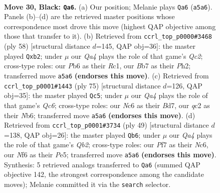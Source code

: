 \documentclass[11pt]{article}
\begin{document}
\clearpage

\begin{figure}[p]\centering
\begin{subfigure}{0.46\textwidth}\centering
\resizebox{\linewidth}{!}{%
\newchessgame
\chessboard[
  setfen={4rk2/Pb2rp2/1pn2n2/qN1p1BNP/P2P2p1/6R1/2Q2K2/7R b - - 0 30},
  showmover=false,
  pgfstyle=straightmove, color=movearrow, markmove={a5-a6}
]}
\caption{}
\end{subfigure}\hfill
\begin{subfigure}{0.46\textwidth}\centering
\resizebox{\linewidth}{!}{%
\newchessgame
\chessboard[
  setfen={4r1k1/rb2qpp1/1pp2n1p/3p4/3PP3/P2N1PP1/1nQ3BP/2R1R1K1 w - - 0 30},
  showmover=false,
  pgfstyle=straightmove, color=movearrow, markmove={c2-b2}
]}
\caption{}
\end{subfigure}
\\[4pt]
\begin{subfigure}{0.46\textwidth}\centering
\resizebox{\linewidth}{!}{%
\newchessgame
\chessboard[
  setfen={r1r3k1/3b1p2/1n4p1/1P1p3p/p2N3P/2q1P1P1/R3BP1K/1R1Q4 b - - 25 38},
  showmover=false,
  pgfstyle=straightmove, color=movearrow, markmove={c3-c5}
]}
\caption{}
\end{subfigure}\hfill
\begin{subfigure}{0.46\textwidth}\centering
\resizebox{\linewidth}{!}{%
\newchessgame
\chessboard[
  setfen={1r1rk3/1q2bp2/2n2n1Q/1N1ppP2/p3P3/P6P/NPP5/2KR1BR1 b - - 0 25},
  showmover=false,
  pgfstyle=straightmove, color=movearrow, markmove={b7-b6}
]}
\caption{}
\end{subfigure}
\caption{\textbf{Move 30, Black: \texttt{Qa6}.} (a) Our position; Melanie plays \texttt{Qa6} (\texttt{a5a6}). Panels (b)--(d) are the retrieved master positions whose correspondence most drove this move (highest QAP objective among those that transfer to it). (b) Retrieved from \texttt{ccrl\_top\_p0000\#3468} (ply 58) [structural distance $d$=145, QAP obj=36]: the master played \texttt{Qxb2}; under $\mu$ our \emph{Qa4} plays the role of that game's \emph{Qc2}; cross-type roles: our \emph{P}b6 as their \emph{R}c1, our \emph{B}b7 as their \emph{P}h2; transferred move \texttt{a5a6} \textbf{(endorses this move)}. (c) Retrieved from \texttt{ccrl\_top\_p0001\#1443} (ply 75) [structural distance $d$=126, QAP obj=35]: the master played \texttt{Qc5}; under $\mu$ our \emph{Qa4} plays the role of that game's \emph{Qc6}; cross-type roles: our \emph{N}c6 as their \emph{B}d7, our \emph{q}c2 as their \emph{N}b6; transferred move \texttt{a5a6} \textbf{(endorses this move)}. (d) Retrieved from \texttt{ccrl\_top\_p0001\#3734} (ply 49) [structural distance $d$=138, QAP obj=26]: the master played \texttt{Qb6}; under $\mu$ our \emph{Qa4} plays the role of that game's \emph{Qb2}; cross-type roles: our \emph{P}f7 as their \emph{N}c6, our \emph{N}f6 as their \emph{P}e5; transferred move \texttt{a5a6} \textbf{(endorses this move)}. Synthesis: 5 retrieved analogs transferred to \texttt{Qa6} (summed QAP objective 142, the strongest correspondence among the candidate moves); Melanie committed it via the \texttt{search} selector.}
\label{fig:thought-m59}
\end{figure}
\end{document}
